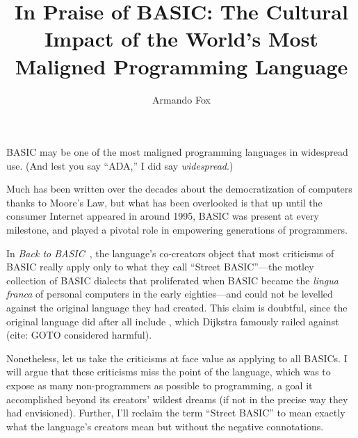 \documentclass{article}
\title{In Praise of BASIC: The Cultural Impact of the World's Most
  Maligned Programming Language}
\author{Armando Fox}
\begin{document}

\maketitle

\noindent{}





BASIC may be one of the most maligned programming languages in
widespread use.  (And lest you say ``ADA,'' I did say
\emph{widespread}.)

Much has been written over the decades about the democratization of
computers thanks to Moore's Law, but what has been overlooked is that up
until the consumer Internet appeared in around 1995, BASIC was present
at every milestone, and played a pivotal role in empowering generations
of programmers.

In \emph{Back to BASIC}~\cite{backtobasic}, the language's co-creators
object that most criticisms of BASIC really apply only to what they call
``Street BASIC''---the motley collection of BASIC dialects that
proliferated when BASIC became the \emph{lingua franca} of personal
computers in the early eighties---and could not be levelled against the
original language they had created.  This claim is doubtful, since the
original language did after all include , which Dijkstra
famously railed against (cite: GOTO considered harmful).

Nonetheless, let us take the criticisms at face value as applying to all
BASICs.  I will argue that these criticisms miss the point of the
language, which was to expose as many non-programmers as possible to
programming, a goal it accomplished beyond its creators' wildest dreams
(if not in the precise way they had envisioned).
Further, I'll reclaim the term ``Street
BASIC'' to mean exactly what the language's creators mean but without
the negative connotations.
\end{document}
